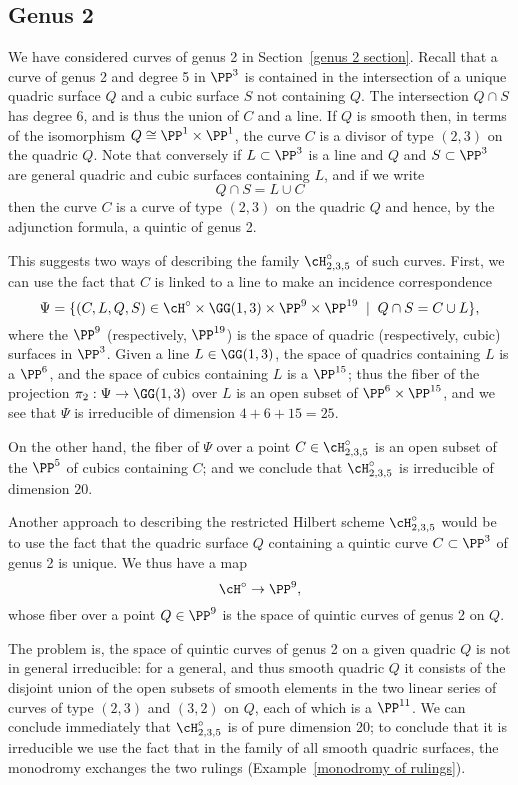 \subsection{Genus 2}

We have considered curves of genus 2 in Section~\ref{genus 2 section}.  Recall that a curve of genus 2 and degree 5 in 
$\PP^3$ is contained in the intersection of a unique quadric surface $Q$ and a cubic surface $S$ not containing $Q$.
The intersection $Q\cap S$
has degree 6, and is thus the union of $C$ and a line. If $Q$ is smooth then, in terms of the isomorphism $Q \cong \PP^1 \times \PP^1$, the curve $C$ is a divisor of type $(2,3)$ on the quadric $Q$. Note that conversely if $L \subset \PP^3$ is a line and $Q$ and $S \subset \PP^3$ are general quadric and cubic surfaces containing $L$, and if we write
$$
Q \cap S = L \cup C
$$ 
then the curve $C$ is a curve of type $(2,3)$ on the quadric $Q$ and hence, by the adjunction formula,
 a quintic of genus 2.

This suggests two ways of describing the family $\cH^\circ_{2,3,5}$ of such curves. First, we can use the fact that $C$ is linked to a line to make an incidence correspondence
$$
\Psi = \{ (C, L, Q, S) \in \cH^\circ \times \GG(1,3) \times \PP^9 \times \PP^{19} \; \mid \; Q \cap S = C \cup L \},
$$
where the $\PP^9$ (respectively, $\PP^{19}$) is the space of quadric (respectively, cubic) surfaces in $\PP^3$. Given a line $L \in \GG(1,3)$, the space of quadrics containing $L$ is a $\PP^6$, and the space of cubics containing $L$ is a $\PP^{15}$; thus the fiber of the projection $\pi_2 : \Psi \to \GG(1,3)$ over $L$ is an open subset of $\PP^6 \times \PP^{15}$, and we see that $\Psi$ is irreducible of dimension $4 + 6 + 15 = 25$.

On the other hand, the fiber of $\Psi$ over a point $C \in \cH^\circ_{2,3,5}$ is an open subset of the $\PP^5$ of cubics containing $C$; and we conclude that $\cH^\circ_{2,3,5}$ is irreducible of dimension $20$.

Another approach to describing the restricted Hilbert scheme $\cH^\circ_{2,3,5}$ would be to use the fact that the quadric surface $Q$ containing a quintic curve $C \subset \PP^3$ of genus 2 is unique. We thus have a map
$$
\cH^\circ \to \PP^9,
$$
whose fiber over a point $Q \in \PP^9$ is the space of quintic curves of genus 2 on $Q$. 

The problem is, the space of quintic curves of genus 2 on a given quadric $Q$ is not in general irreducible: for a general, and thus smooth quadric $Q$ it consists of the disjoint union of the open subsets of smooth elements in the two linear series of curves of type $(2,3)$ and $(3,2)$ on $Q$, each of which is a $\PP^{11}$. We can conclude immediately that $\cH^\circ_{2,3,5}$ is of pure dimension 20; to conclude that it is irreducible we use the fact that in the family of all smooth quadric surfaces, the monodromy exchanges the two rulings (Example~\ref{monodromy of rulings}).

